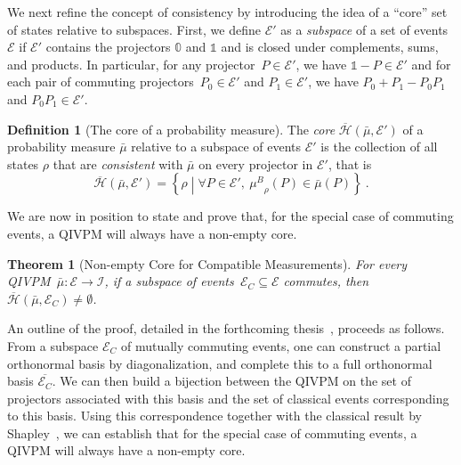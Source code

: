 \documentclass[english,reprint, aps, prl,superscriptaddress, showpacs,
showkeys, longbibliography, amsmath, amssymb, floatfix]{revtex4-1}
\theoremstyle{plain}
\newtheorem{thm}{Theorem}
\theoremstyle{definition}
\newtheorem{definition}{Definition}
\newcommand{\Hilb}{\mathcal{H}}
\newcommand{\events}{\ensuremath{\mathcal{E}}}
\newcommand{\set}[2]{\ensuremath{\left\{ {#1}\mathrel{}\middle|\mathrel{}{#2}\right\} }}
\newcommand{\coreBorn}{\ensuremath{\overline{\Hilb}}}
\newcommand{\muB}{\ensuremath{\mu^{B}}}
\newcommand{\eventsC}{\ensuremath{\events_{C}}}
\begin{document}
We next refine the concept of consistency by introducing the idea of
a ``core'' set of states relative to subspaces. First, we define
$\events'$ as a \emph{subspace} of a set of events~$\events$ if
$\events'$ contains the projector{\color{red}s} $\mathbb{0}$ and $\mathbb{1}$ and is closed under
complements, sums, and products.  In particular, for any
projector~$P\in\events'$, we have
$\mathbb{1}-P\in\events'$ and for each pair of commuting
projectors~$P_{0}\in\events'$ and $P_{1}\in\events'$, we have
$P_{0}+P_{1}-P_{0}P_{1}$ and $P_{0}P_{1}\in\events'$.

\begin{definition}[The core of a probability measure]\label{def:core} The
\emph{core}
$\coreBorn\left(\bar{\mu},\events'\right)$ of a probability measure 
$\bar{\mu}$ relative to a subspace of events $\events'$ is the
collection of all states $\rho$ that are \emph{consistent} with 
$\bar{\mu}$ on every projector in $\events'$, that is
\begin{equation}
\label{eq:hbar}
\coreBorn\left(\bar{\mu},\events'\right) = \set{\rho}{\forall P\in
\events',~\muB_{\rho}\left(P\right)\in\bar{\mu}\left(P\right)} \ .
\end{equation}
\end{definition}

We are now in position to state and prove that, for the special case
of commuting events, a QIVPM will always have a non-empty core.

\begin{thm}[Non-empty Core for Compatible Measurements] \label{thm:Shapley}
  For every QIVPM~$\bar{\mu}:\events\rightarrow\mathscr{I}$, if a subspace
  of events~$\eventsC\subseteq\events$ commutes, then
  $\coreBorn\left(\bar{\mu},\eventsC\right)\ne\emptyset$.
\end{thm}

{\color{red}An outline of t}he proof, detailed in the forthcoming
thesis~\cite{TaiThesis2018}, proceeds as
follows. From a subspace $\eventsC$ of mutually commuting events, one
can construct a partial orthonormal basis by diagonalization, and
complete this to a full orthonormal basis $\overline{\eventsC}$.  We
can then build a bijection between the QIVPM on the set of projectors
associated with this basis and the set of classical events
corresponding to this basis.  Using this correspondence together with
the classical result by
Shapley~\cite{Shapley1971,GilboaSchmeidler1994,NgMoYeh1997,Grabisch2016},
we can establish that for the special case of commuting events, a
QIVPM will always have a non-empty core.
\end{document}
